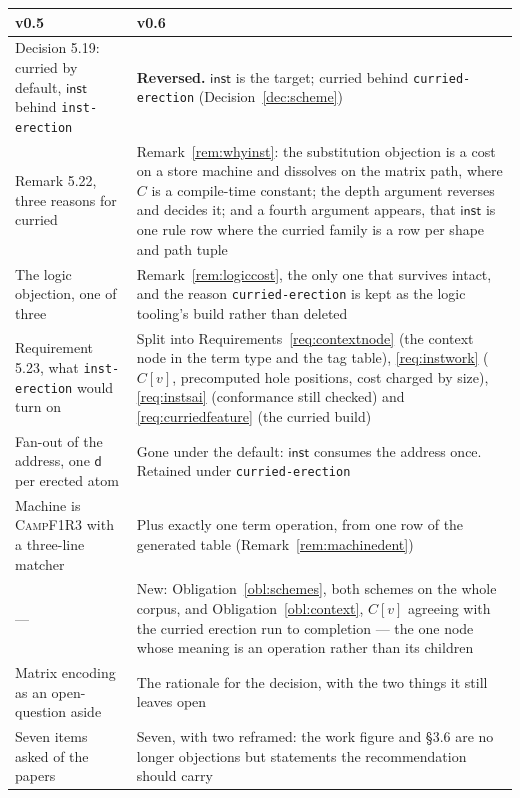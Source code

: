 \documentclass[11pt,a4paper]{article}
\newcommand{\code}[1]{\texttt{#1}}
\newcommand{\Camp}{\textsc{CampF1R3}}
\newcommand{\dd}{\mathsf{d}}
\newcommand{\inst}{\mathsf{inst}}
\theoremstyle{definition}
\theoremstyle{plain}
\begin{document}
\begin{center}
\footnotesize

\begin{tabularx}{\linewidth}{@{}l>{\raggedright\arraybackslash}X@{}}
\toprule
v0.5 & v0.6\\
\midrule
Decision 5.19: curried by default, $\inst$ behind \code{inst-erection} &
\textbf{Reversed.} $\inst$ is the target; curried behind
\code{curried-erection} (Decision~\ref{dec:scheme})\\
Remark 5.22, three reasons for curried & Remark~\ref{rem:whyinst}: the
substitution objection is a cost on a store machine and dissolves on the
matrix path, where $C$ is a compile-time constant; the depth argument reverses
and decides it; and a fourth argument appears, that $\inst$ is one rule row
where the curried family is a row per shape and path tuple\\
The logic objection, one of three & Remark~\ref{rem:logiccost}, the only one
that survives intact, and the reason \code{curried-erection} is kept as the
logic tooling's build rather than deleted\\
Requirement 5.23, what \code{inst-erection} would turn on & Split into
Requirements~\ref{req:contextnode} (the context node in the term type and the
tag table), \ref{req:instwork} ($C[v]$, precomputed hole positions, cost
charged by size), \ref{req:instsai} (conformance still checked) and
\ref{req:curriedfeature} (the curried build)\\
Fan-out of the address, one $\dd$ per erected atom & Gone under the default:
$\inst$ consumes the address once. Retained under
\code{curried-erection}\\
Machine is \Camp{} with a three-line matcher & Plus exactly one term
operation, from one row of the generated table
(Remark~\ref{rem:machinedent})\\
--- & New: Obligation~\ref{obl:schemes}, both schemes on the whole corpus,
and Obligation~\ref{obl:context}, $C[v]$ agreeing with the curried erection
run to completion --- the one node whose meaning is an operation rather than
its children\\
Matrix encoding as an open-question aside & The rationale for the decision,
with the two things it still leaves open\\
Seven items asked of the papers & Seven, with two reframed: the work figure
and \S3.6 are no longer objections but statements the recommendation should
carry\\
\bottomrule
\end{tabularx}
\end{center}
\end{document}
